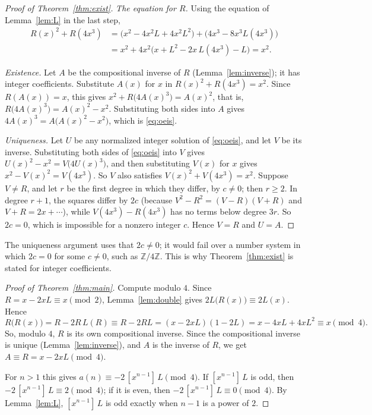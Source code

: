 \documentclass[11pt,a4paper]{article}
\theoremstyle{definition}
\theoremstyle{remark}
\newcommand{\Z}{\mathbb{Z}}
\newcommand{\coeff}[2]{[x^{#1}]\,#2}
\begin{document}
\begin{proof}[Proof of Theorem~\ref{thm:exist}]
\emph{The equation for $R$.} Using the equation of Lemma~\ref{lem:L} in the last step,
\begin{align*}
R(x)^2+R(4x^3)&=\bigl(x^2-4x^2L+4x^2L^2\bigr)+\bigl(4x^3-8x^3L(4x^3)\bigr)\\
&=x^2+4x^2\bigl(x+L^2-2x\,L(4x^3)-L\bigr)=x^2 .
\end{align*}

\emph{Existence.} Let $A$ be the compositional inverse of $R$ (Lemma~\ref{lem:inverse}); it has integer coefficients.
Substitute $A(x)$ for $x$ in $R(x)^2+R(4x^3)=x^2$. Since $R(A(x))=x$, this gives $x^2+R\bigl(4A(x)^3\bigr)=A(x)^2$, that is,
$R\bigl(4A(x)^3\bigr)=A(x)^2-x^2$. Substituting both sides into $A$ gives $4A(x)^3=A\bigl(A(x)^2-x^2\bigr)$, which is
\eqref{eq:oeis}.

\emph{Uniqueness.} Let $U$ be any normalized integer solution of \eqref{eq:oeis}, and let $V$ be its inverse.
Substituting both sides of \eqref{eq:oeis} into $V$ gives $U(x)^2-x^2=V\bigl(4U(x)^3\bigr)$, and then substituting $V(x)$ for $x$ gives
$x^2-V(x)^2=V(4x^3)$. So $V$ also satisfies $V(x)^2+V(4x^3)=x^2$. Suppose $V\ne R$, and let $r$ be the first degree in
which they differ, by $c\ne0$; then $r\ge2$. In degree $r+1$, the squares differ by $2c$ (because
$V^2-R^2=(V-R)(V+R)$ and $V+R=2x+\cdots$), while $V(4x^3)-R(4x^3)$ has no terms below degree $3r$. So $2c=0$, which is
impossible for a nonzero integer $c$. Hence $V=R$ and $U=A$.
\end{proof}

The uniqueness argument uses that $2c\ne0$; it would fail over a number system in which $2c=0$ for some $c\neq0$, such as
$\Z/4\Z$. This is why Theorem~\ref{thm:exist} is stated for integer coefficients.

\begin{proof}[Proof of Theorem~\ref{thm:main}]
Compute modulo $4$. Since $R=x-2xL\equiv x\pmod 2$, Lemma~\ref{lem:double} gives $2L\bigl(R(x)\bigr)\equiv2L(x)$. Hence
\[
R\bigl(R(x)\bigr)=R-2R\,L(R)\equiv R-2RL=(x-2xL)(1-2L)=x-4xL+4xL^2\equiv x\pmod 4 .
\]
So, modulo $4$, $R$ is its own compositional inverse. Since the compositional inverse is unique
(Lemma~\ref{lem:inverse}), and $A$ is the inverse of $R$, we get $A\equiv R=x-2xL\pmod 4$.

For $n>1$ this gives $a(n)\equiv-2\,\coeff{n-1}{L}\pmod 4$. If $\coeff{n-1}{L}$ is odd, then
$-2\,\coeff{n-1}{L}\equiv2\pmod4$; if it is even, then $-2\,\coeff{n-1}{L}\equiv0\pmod 4$. By Lemma~\ref{lem:L},
$\coeff{n-1}{L}$ is odd exactly when $n-1$ is a power of $2$.
\end{proof}
\end{document}
